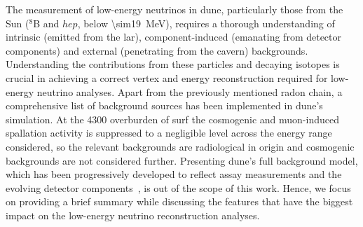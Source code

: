 The measurement of low-energy neutrinos in \gls{dune}, particularly those from the Sun ($^8$B and $hep$, below \SI{\sim19}{\mega\electronvolt}), requires a thorough understanding of intrinsic (emitted from the \gls{lar}), component-induced (emanating from detector components) and external (penetrating from the cavern) backgrounds. Understanding the contributions from these particles and decaying isotopes is crucial in achieving a correct vertex and energy reconstruction required for low-energy neutrino analyses. Apart from the previously mentioned radon chain, a comprehensive list of background sources has been implemented in \gls{dune}'s simulation. At the \SI{4300}{\metersofwater} overburden of \gls{surf} the cosmogenic and muon-induced spallation activity is suppressed to a negligible level across the energy range considered, so the relevant backgrounds are radiological in origin and cosmogenic backgrounds are not considered further. Presenting \gls{dune}'s full background model, which has been progressively developed to reflect assay measurements and the evolving detector components~\cite{Westerdale:2024cossurf}, is out of the scope of this work. Hence, we focus on providing a brief summary while discussing the features that have the biggest impact on the low-energy neutrino reconstruction analyses.

